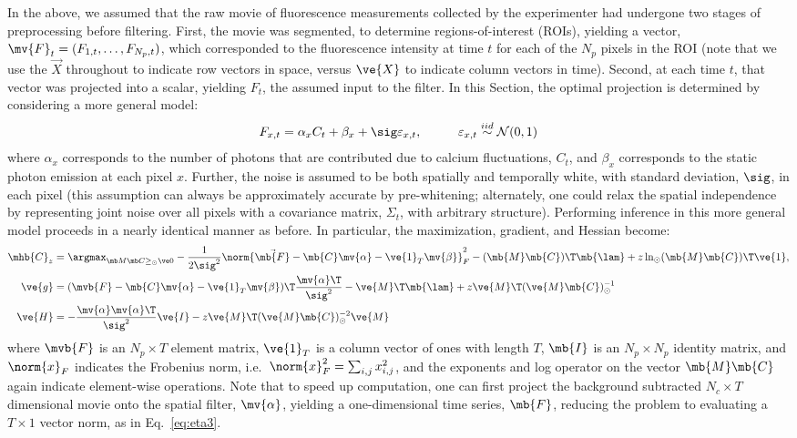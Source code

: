 In the above, we assumed that the raw movie of fluorescence measurements collected by the experimenter had undergone two stages of preprocessing before filtering.  First, the movie was segmented, to determine regions-of-interest (ROIs), yielding a vector, $\mv{F}_t=(F_{1,t}, \ldots, F_{N_p,t})$, which corresponded to the fluorescence intensity at time $t$ for each of the $N_p$ pixels in the ROI (note that we use the $\vec{X}$ throughout to indicate row vectors in space, versus $\ve{X}$ to indicate column vectors in time).  Second, at each time $t$, that vector was projected into a scalar, yielding $F_t$, the assumed input to the filter.  In this Section, the optimal projection is determined by considering a more general model:
\begin{align} \label{eq:bF}
F_{x,t} &= \alpha_x C_t + \beta_x +  \sig \varepsilon_{x,t}, \qquad &\varepsilon_{x,t} \overset{iid}{\sim} \mathcal{N}(0,1)   
\end{align}
\noindent where $\alpha_x$ corresponds to the number of photons that are contributed due to calcium fluctuations, $C_t$, and $\beta_x$ corresponds to the static photon emission at each pixel $x$.  Further, the noise is assumed to be both spatially and temporally white, with standard deviation, $\sig$, in each pixel (this assumption can always be approximately accurate by pre-whitening; alternately, one could relax the spatial independence by representing joint noise over all pixels with a covariance matrix, $\Sigma_{t}$, with arbitrary structure).  Performing inference in this more general model proceeds in a  nearly identical manner as before. In particular, the maximization, gradient, and Hessian become:
\begin{align} 
\mhb{C}_{\zzz} 
&= \az  -\frac{1}{2 \sig^2} \norm{\vec{\mb{F}} - \mb{C} \mv{\alpha} - \ve{1}_T \mv{\beta}}_F^2 - (\mb{M} \mb{C} )\T \mb{\lam}  + \zzz \ln_\odot(\mb{M} \mb{C})\T\ve{1},  \label{eq:eta4}\\
\ve{g} &= (\mvb{F} - \mb{C} \mv{\alpha} - \ve{1}_T \mv{\beta})\T\frac{\mv{\alpha}\T}{\sig^2} - \ve{M}\T\mb{\lam} + \zzz \ve{M}\T (\ve{M} \mb{C})_\odot^{-1} \label{eq:g2} \\
\ve{H} &= -\frac{\mv{\alpha} \mv{\alpha}\T}{\sig^2} \ve{I} - \zzz \ve{M}\T (\ve{M} \mb{C})_\odot^{-2} \ve{M} \label{eq:H2}
\end{align}
\noindent where $\mvb{F}$ is an $N_p \times T$ element matrix, $\ve{1}_T$ is a column vector of ones with length $T$, $\mb{I}$ is an $N_p \times N_p$ identity matrix, and $\norm{x}_F$ indicates the Frobenius norm, i.e.\ $\norm{x}_F^2= \sum_{i,j} x_{i,j}^2$, and the exponents and log operator on the vector $\mb{M}\mb{C}$ again indicate element-wise operations.  Note that to speed up computation, one can first project the background subtracted $N_c \times T$ dimensional movie onto the spatial filter, $\mv{\alpha}$, yielding a one-dimensional time series, $\mb{F}$, reducing the problem to evaluating a $T \times 1$ vector norm, as in Eq.~\eqref{eq:eta3}.

